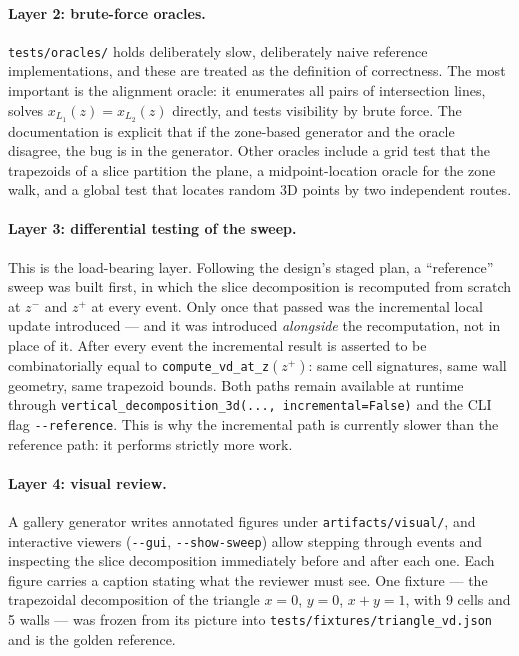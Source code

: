 \documentclass[11pt]{article}
\begin{document}
\paragraph{Layer 2: brute-force oracles.}
\texttt{tests/oracles/} holds deliberately slow, deliberately naive reference
implementations, and these are treated as the definition of correctness.  The
most important is the alignment oracle: it enumerates all pairs of intersection
lines, solves $x_{L_1}(z) = x_{L_2}(z)$ directly, and tests visibility by brute
force.  The documentation is explicit that if the zone-based generator and the
oracle disagree, the bug is in the generator.  Other oracles include a grid
test that the trapezoids of a slice partition the plane, a midpoint-location
oracle for the zone walk, and a global test that locates random 3D points by
two independent routes.

\paragraph{Layer 3: differential testing of the sweep.}
This is the load-bearing layer.  Following the design's staged plan, a
``reference'' sweep was built first, in which the slice decomposition is
recomputed from scratch at $z^-$ and $z^+$ at every event.  Only once that
passed was the incremental local update introduced --- and it was introduced
\emph{alongside} the recomputation, not in place of it.  After every event the
incremental result is asserted to be combinatorially equal to
\texttt{compute\_vd\_at\_z}$(z^+)$: same cell signatures, same wall geometry,
same trapezoid bounds.  Both paths remain available at runtime through
\verb|vertical_decomposition_3d(..., incremental=False)| and the CLI flag
\verb|--reference|.  This is why the incremental path is currently slower than
the reference path: it performs strictly more work.

\paragraph{Layer 4: visual review.}
A gallery generator writes annotated figures under \texttt{artifacts/visual/},
and interactive viewers (\verb|--gui|, \verb|--show-sweep|) allow stepping
through events and inspecting the slice decomposition immediately before and
after each one.  Each figure carries a caption stating what the reviewer must
see.  One fixture --- the trapezoidal decomposition of the triangle $x = 0$,
$y = 0$, $x + y = 1$, with 9 cells and 5 walls --- was frozen from its picture
into \texttt{tests/fixtures/triangle\_vd.json} and is the golden reference.
\end{document}
